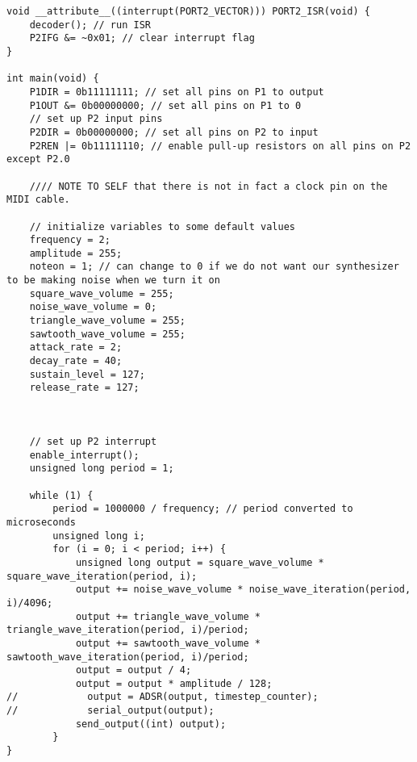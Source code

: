 \begin{lstlisting}[label={lst:lstlisting}]
void __attribute__((interrupt(PORT2_VECTOR))) PORT2_ISR(void) {
    decoder(); // run ISR
    P2IFG &= ~0x01; // clear interrupt flag
}

int main(void) {
    P1DIR = 0b11111111; // set all pins on P1 to output
    P1OUT &= 0b00000000; // set all pins on P1 to 0
    // set up P2 input pins
    P2DIR = 0b00000000; // set all pins on P2 to input
    P2REN |= 0b11111110; // enable pull-up resistors on all pins on P2 except P2.0

    //// NOTE TO SELF that there is not in fact a clock pin on the MIDI cable.

    // initialize variables to some default values
    frequency = 2;
    amplitude = 255;
    noteon = 1; // can change to 0 if we do not want our synthesizer to be making noise when we turn it on
    square_wave_volume = 255;
    noise_wave_volume = 0;
    triangle_wave_volume = 255;
    sawtooth_wave_volume = 255;
    attack_rate = 2;
    decay_rate = 40;
    sustain_level = 127;
    release_rate = 127;



    // set up P2 interrupt
    enable_interrupt();
    unsigned long period = 1;

    while (1) {
        period = 1000000 / frequency; // period converted to microseconds
        unsigned long i;
        for (i = 0; i < period; i++) {
            unsigned long output = square_wave_volume * square_wave_iteration(period, i);
            output += noise_wave_volume * noise_wave_iteration(period, i)/4096;
            output += triangle_wave_volume * triangle_wave_iteration(period, i)/period;
            output += sawtooth_wave_volume * sawtooth_wave_iteration(period, i)/period;
            output = output / 4;
            output = output * amplitude / 128;
//            output = ADSR(output, timestep_counter);
//            serial_output(output);
            send_output((int) output);
        }
}
\end{lstlisting}
